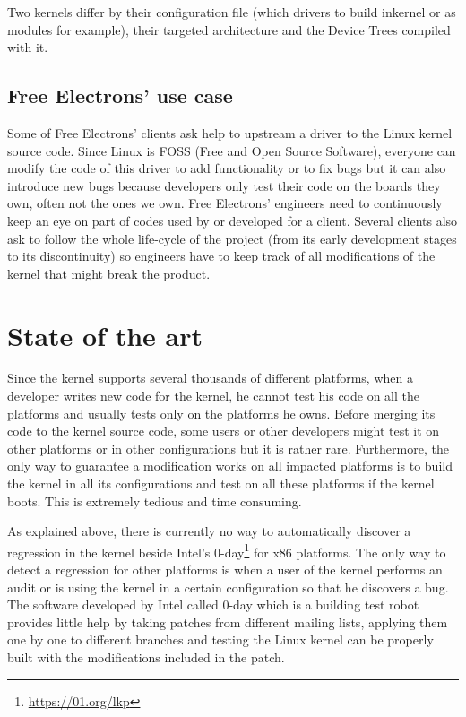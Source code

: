 Two kernels differ by their configuration file (which drivers to build inkernel or as modules for example), their targeted architecture and the Device Trees compiled with it.

\subsection{Free Electrons' use case}
Some of Free Electrons' clients ask help to upstream a driver to the Linux kernel source code. Since Linux is FOSS (Free and Open Source Software), everyone can modify the code of this driver to add functionality or to fix bugs but it can also introduce new bugs because developers only test their code on the boards they own, often not the ones we own. Free Electrons' engineers need to continuously keep an eye on part of codes used by or developed for a client. Several clients also ask to follow the whole life-cycle of the project (from its early development stages to its discontinuity) so engineers have to keep track of all modifications of the kernel that might break the product.

\section{State of the art}
Since the kernel supports several thousands of different platforms, when a developer writes new code for the kernel, he cannot test his code on all the platforms and usually tests only on the platforms he owns. Before merging its code to the kernel source code, some users or other developers might test it on other platforms or in other configurations but it is rather rare. Furthermore, the only way to guarantee a modification works on all impacted platforms is to build the kernel in all its configurations and test on all these platforms if the kernel boots. This is extremely tedious and time consuming.

As explained above, there is currently no way to automatically discover a regression in the kernel beside Intel's 0-day\footnote{\url{https://01.org/lkp}} for x86 platforms. The only way to detect a regression for other platforms is when a user of the kernel performs an audit or is using the kernel in a certain configuration so that he discovers a bug. The software developed by Intel called 0-day which is a building test robot provides little help by taking patches from different mailing lists, applying them one by one to different branches and testing the Linux kernel can be properly built with the modifications included in the patch.

